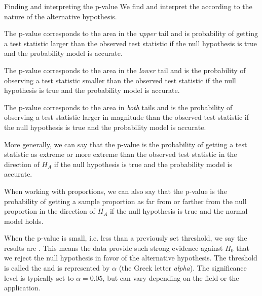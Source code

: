 \begin{onebox}{Finding and interpreting the p-value}
We find and interpret the  according to the nature of the alternative hypothesis.\vspace{-1mm}
\begin{description}
\setlength{\itemsep}{0mm}

\item[$H_A$: parameter $>$ null value.] The p-value corresponds to the area in the \emph{upper} tail and is probability of getting a test statistic larger than the observed test statistic if the null hypothesis is true and the probability model is accurate.  

\item[$H_A$: parameter $<$ null value.] The p-value corresponds to the area in the \emph{lower} tail and is the probability of observing a test statistic smaller than the observed test statistic if the null hypothesis is true and the probability model is accurate. 

\item[$H_A$: parameter $\ne$ null value.] The p-value corresponds to the area in \emph{both} tails and is the probability of observing a test statistic larger in magnitude than the observed test statistic if the null hypothesis is true and the probability model is accurate. 

\item[] More generally, we can say that the p-value is the probability of getting a test statistic as extreme or more extreme than the observed test statistic in the direction of $H_A$ if the null hypothesis is true and the probability model is accurate.

\end{description}\end{onebox}

When working with proportions, we can also say that the p-value is the probability of getting a sample proportion as far from or farther from the null proportion in the direction of $H_A$ if the null hypothesis is true and the normal model holds.

When the p-value is small, i.e. less than a previously set threshold, we say the results are . This means the data provide such strong evidence against $H_0$ that we reject the null hypothesis in favor of the alternative hypothesis. The threshold is called the  and is represented by $\alpha$ (the Greek letter \emph{alpha}\label{alphadiscussion}).  The significance level is typically set to $\alpha = 0.05$, but can vary depending on the field or the application. %

